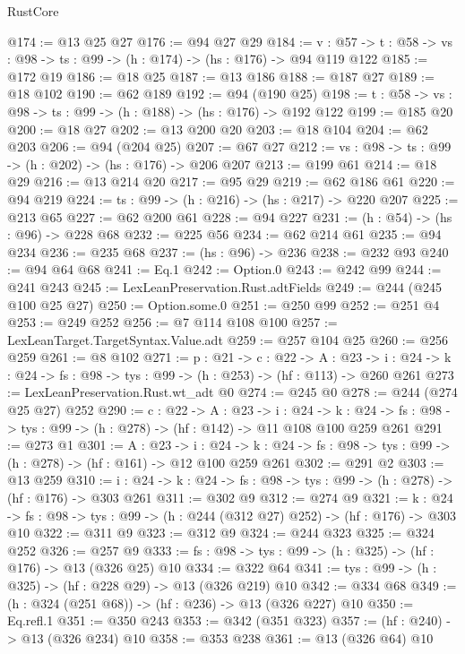 \begin{lexlean}{RustCore}
\begin{coremodule}
@174 := @13 @25 @27
@176 := @94 @27 @29
@184 := {v : @57} ->
  {t : @58} -> {vs : @98} -> {ts : @99} -> (h : @174) -> (hs : @176) -> @94 @119 @122
@185 := @172 @19
@186 := @18 @25
@187 := @13 @186
@188 := @187 @27
@189 := @18 @102
@190 := @62 @189
@192 := @94 (@190 @25)
@198 := {t : @58} -> {vs : @98} -> {ts : @99} -> (h : @188) -> (hs : @176) -> @192 @122
@199 := @185 @20
@200 := @18 @27
@202 := @13 @200 @20
@203 := @18 @104
@204 := @62 @203
@206 := @94 (@204 @25)
@207 := @67 @27
@212 := {vs : @98} -> {ts : @99} -> (h : @202) -> (hs : @176) -> @206 @207
@213 := @199 @61
@214 := @18 @29
@216 := @13 @214 @20
@217 := @95 @29
@219 := @62 @186 @61
@220 := @94 @219
@224 := {ts : @99} -> (h : @216) -> (hs : @217) -> @220 @207
@225 := @213 @65
@227 := @62 @200 @61
@228 := @94 @227
@231 := (h : @54) -> (hs : @96) -> @228 @68
@232 := @225 @56
@234 := @62 @214 @61
@235 := @94 @234
@236 := @235 @68
@237 := (hs : @96) -> @236
@238 := @232 @93
@240 := @94 @64 @68
@241 := Eq.{1}
@242 := Option.{0}
@243 := @242 @99
@244 := @241 @243
@245 := LexLeanPreservation.Rust.adtFields
@249 := @244 (@245 @100 @25 @27)
@250 := Option.some.{0}
@251 := @250 @99
@252 := @251 @4
@253 := @249 @252
@256 := @7 @114 @108 @100
@257 := LexLeanTarget.TargetSyntax.Value.adt
@259 := @257 @104 @25
@260 := @256 @259
@261 := @8 @102
@271 := {p : @21} ->
  {c : @22} ->
  {A : @23} ->
  {i : @24} -> {k : @24} -> {fs : @98} -> {tys : @99} -> (h : @253) -> (hf : @113) -> @260 @261
@273 := LexLeanPreservation.Rust.wt_adt @0
@274 := @245 @0
@278 := @244 (@274 @25 @27) @252
@290 := {c : @22} ->
  {A : @23} ->
  {i : @24} ->
  {k : @24} -> {fs : @98} -> {tys : @99} -> (h : @278) -> (hf : @142) -> @11 @108 @100 @259 @261
@291 := @273 @1
@301 := {A : @23} ->
  {i : @24} ->
  {k : @24} -> {fs : @98} -> {tys : @99} -> (h : @278) -> (hf : @161) -> @12 @100 @259 @261
@302 := @291 @2
@303 := @13 @259
@310 := {i : @24} ->
  {k : @24} -> {fs : @98} -> {tys : @99} -> (h : @278) -> (hf : @176) -> @303 @261
@311 := @302 @9
@312 := @274 @9
@321 := {k : @24} ->
  {fs : @98} -> {tys : @99} -> (h : @244 (@312 @27) @252) -> (hf : @176) -> @303 @10
@322 := @311 @9
@323 := @312 @9
@324 := @244 @323
@325 := @324 @252
@326 := @257 @9
@333 := {fs : @98} -> {tys : @99} -> (h : @325) -> (hf : @176) -> @13 (@326 @25) @10
@334 := @322 @64
@341 := {tys : @99} -> (h : @325) -> (hf : @228 @29) -> @13 (@326 @219) @10
@342 := @334 @68
@349 := (h : @324 (@251 @68)) -> (hf : @236) -> @13 (@326 @227) @10
@350 := Eq.refl.{1}
@351 := @350 @243
@353 := @342 (@351 @323)
@357 := (hf : @240) -> @13 (@326 @234) @10
@358 := @353 @238
@361 := @13 (@326 @64) @10

\end{coremodule}
\end{lexlean}
